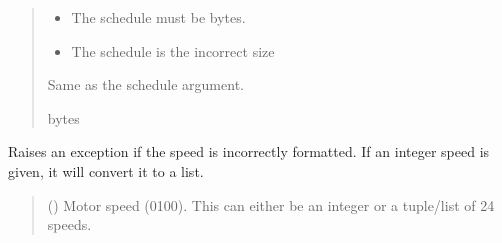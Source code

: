 \documentclass[letterpaper,10pt,english]{sphinxmanual}
\begin{document}
\begin{fulllineitems}
\begin{fulllineitems}
\begin{quote}
\begin{description}
\begin{itemize}
\end{itemize}

\begin{itemize}
\item {} 
\sphinxAtStartPar
{} \textendash{} The schedule must be bytes.

\item {} 
\sphinxAtStartPar
{} \textendash{} The schedule is the incorrect size

\end{itemize}

\sphinxAtStartPar
Same as the schedule argument.

\sphinxAtStartPar
bytes

\end{description}\end{quote}

\end{fulllineitems}


\begin{fulllineitems}
\label{\detokenize{PodDevice_8229:PodDevice_8229.POD_8229._Validate_Speed}}
\pysigstartsignatures
{}
\pysigstopsignatures
\sphinxAtStartPar
Raises an exception if the speed is incorrectly formatted. If an integer speed         is given, it will convert it to a list.
\begin{quote}\begin{description}
\sphinxAtStartPar
{} (\sphinxstyleliteralemphasis{\sphinxupquote{ | }}\sphinxstyleliteralemphasis{\sphinxupquote{ | }}\sphinxstyleliteralemphasis{\sphinxupquote{{[}}}\sphinxstyleliteralemphasis{\sphinxupquote{{]}}}) \textendash{} Motor speed (0\sphinxhyphen{}100). This can either be an                 integer or a tuple/list of 24 speeds.


\end{description}
\end{quote}
\end{fulllineitems}
\end{fulllineitems}
\end{document}

